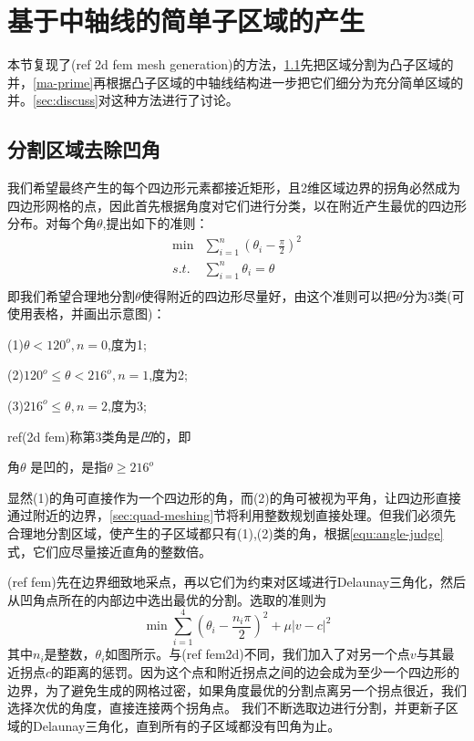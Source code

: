 \section{基于中轴线的简单子区域的产生}\label{sec:ma_subdivion}
本节复现了(ref 2d fem mesh generation)的方法，\ref{sec:cocavity-removal}先把区域分割为凸子区域的并，\ref{ma-prime}再根据凸子区域的中轴线结构进一步把它们细分为充分简单区域的并。\ref{sec:discuss}对这种方法进行了讨论。
\subsection{分割区域去除凹角}\label{sec:cocavity-removal}
我们希望最终产生的每个四边形元素都接近矩形，且2维区域边界的拐角必然成为四边形网格的点，因此首先根据角度对它们进行分类，以在附近产生最优的四边形分布。对每个角$\theta$,提出如下的准则：
\begin{equation} \label{equ:angle-judge}
\begin{split}
\min  &{\sum_{i=1}^n(\theta_i-\frac{\pi}{2})^2}\\
s.t.\,  &\sum_{i=1}^{n}\theta_i=\theta\\
\end{split}
\end{equation}
即我们希望合理地分割$\theta$使得附近的四边形尽量好，由这个准则可以把$\theta$分为3类(可使用表格，并画出示意图)：
	
(1)$\theta < 120^o,n=0$,度为1;

(2)$120^o \leq \theta < 216^o,n=1$,度为2;

(3)$216^o \leq \theta,n=2$,度为3;

ref(2d fem)称第3类角是\emph{凹}的，即
\begin{definition}\label{def:concave}
	角$\theta$ 是凹的，是指$\theta \geq 216^o$
\end{definition}
显然(1)的角可直接作为一个四边形的角，而(2)的角可被视为平角，让四边形直接通过附近的边界，\ref{sec:quad-meshing}节将利用整数规划直接处理。但我们必须先合理地分割区域，使产生的子区域都只有(1),(2)类的角，根据\ref{equ:angle-judge}式，它们应尽量接近直角的整数倍。

(ref fem)先在边界细致地采点，再以它们为约束对区域进行Delaunay三角化，然后从凹角点所在的内部边中选出最优的分割。选取的准则为
\begin{equation} \label{equ:split-concave}
\min \sum_{i=1}^{4}(\theta_i-\frac{n_i\pi}{2})^2+\mu \left |v-c\right |^2
\end{equation}
其中$n_i$是整数，$\theta_i$如图所示。与(ref fem2d)不同，我们加入了对另一个点$v$与其最近拐点$c$的距离的惩罚。因为这个点和附近拐点之间的边会成为至少一个四边形的边界，为了避免生成的网格过密，如果角度最优的分割点离另一个拐点很近，我们选择次优的角度，直接连接两个拐角点。  
我们不断选取边进行分割，并更新子区域的Delaunay三角化，直到所有的子区域都没有凹角为止。
